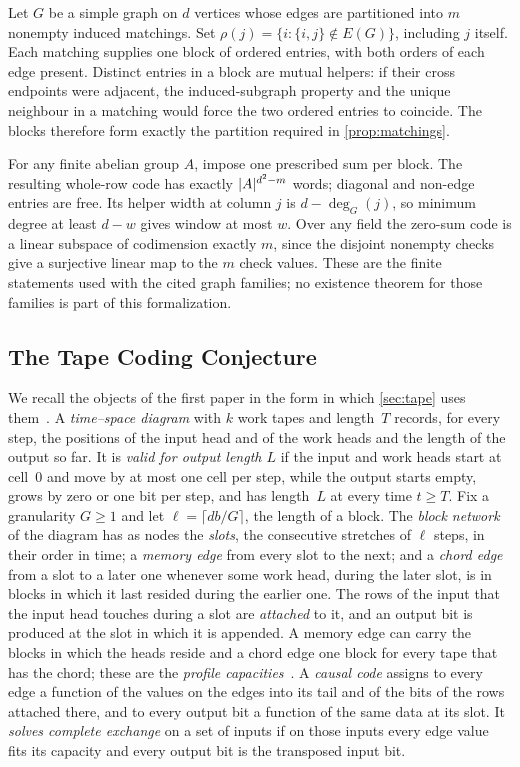 \begin{outline}
Let $G$ be a simple graph on $d$ vertices whose edges are partitioned into $m$ nonempty induced matchings.
Set $\rho(j)=\{i:\{i,j\}\notin E(G)\}$, including $j$ itself. Each matching supplies one block of ordered
entries, with both orders of each edge present. Distinct entries in a block are mutual helpers: if their
cross endpoints were adjacent, the induced-subgraph property and the unique neighbour in a matching would
force the two ordered entries to coincide. The blocks therefore form exactly the partition required in
\cref{prop:matchings}.

For any finite abelian group $A$, impose one prescribed sum per block. The resulting whole-row code has
exactly $\lvert A \rvert^{d^2-m}$ words; diagonal and non-edge entries are free. Its helper width at column $j$ is
$d-\deg_G(j)$, so minimum degree at least $d-w$ gives window at most $w$. Over any field the zero-sum code
is a linear subspace of codimension exactly $m$, since the disjoint nonempty checks give a surjective linear
map to the $m$ check values. These are the finite statements used with the cited graph families; no
existence theorem for those families is part of this formalization.
\end{outline}

\subsection{The Tape Coding Conjecture}\label{sec:prelim-tcc}

We recall the objects of the first paper in the form in which \cref{sec:tape} uses
them~\cite[Sections~8 and~9]{FirstPaper2026}. A \emph{time--space diagram} with $k$ work tapes and length~$T$ records,
for every step, the positions of the input head and of the work heads and the length of the output so far. It is
\emph{valid for output length $L$} if the input and work heads start at cell~$0$ and move by at most one cell per
step, while the output starts empty, grows by zero or one bit per step, and has length~$L$ at every time $t\ge T$.
Fix a granularity $G\ge1$ and let $\ell=\lceil db/G\rceil$, the length of a block. The \emph{block network} of
the diagram has as nodes the \emph{slots}, the consecutive stretches of $\ell$ steps, in their order in time; a
\emph{memory edge} from every slot to the next; and a \emph{chord edge} from a slot to a later one whenever some work
head, during the later slot, is in blocks in which it last resided during the earlier one. The rows of the input that
the input head touches during a slot are \emph{attached} to it, and an output bit is produced at the slot in which it
is appended. A memory edge can carry the blocks in which the heads reside and a chord edge one block for every tape
that has the chord; these are the \emph{profile capacities}~\cite[Definitions~8.2 and~8.3]{FirstPaper2026}.
A \emph{causal code} assigns to every
edge a function of the values on the edges into its tail and of the bits of the rows attached there, and to every
output bit a function of the same data at its slot. It \emph{solves complete exchange} on a set of inputs if on those
inputs every edge value fits its capacity and every output bit is the transposed input bit.

